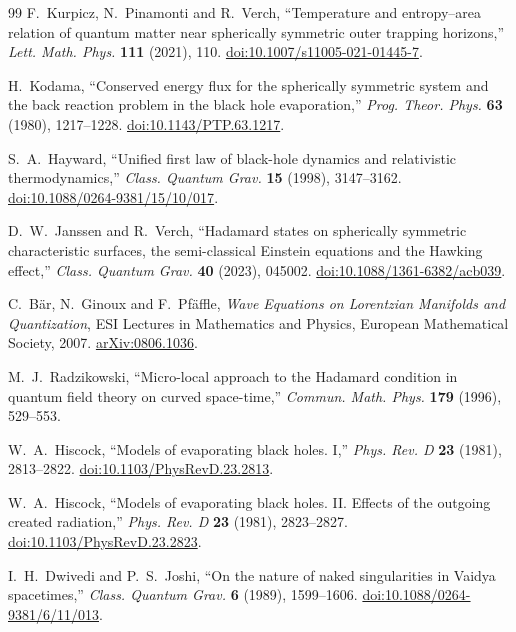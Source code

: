 \documentclass[11pt,a4paper]{article}
\theoremstyle{definition}
\theoremstyle{remark}
\begin{document}
\begin{thebibliography}{99}
		F.~Kurpicz, N.~Pinamonti and R.~Verch,
		``Temperature and entropy--area relation of quantum matter near spherically
		symmetric outer trapping horizons,''
		\emph{Lett. Math. Phys.} \textbf{111} (2021), 110.
		\href{https://doi.org/10.1007/s11005-021-01445-7}{doi:10.1007/s11005-021-01445-7}.
		
		H.~Kodama,
		``Conserved energy flux for the spherically symmetric system and the back
		reaction problem in the black hole evaporation,''
		\emph{Prog. Theor. Phys.} \textbf{63} (1980), 1217--1228.
		\href{https://doi.org/10.1143/PTP.63.1217}{doi:10.1143/PTP.63.1217}.
		
		S.~A.~Hayward,
		``Unified first law of black-hole dynamics and relativistic thermodynamics,''
		\emph{Class. Quantum Grav.} \textbf{15} (1998), 3147--3162.
		\href{https://doi.org/10.1088/0264-9381/15/10/017}{doi:10.1088/0264-9381/15/10/017}.
		
		D.~W.~Janssen and R.~Verch,
		``Hadamard states on spherically symmetric characteristic surfaces, the
		semi-classical Einstein equations and the Hawking effect,''
		\emph{Class. Quantum Grav.} \textbf{40} (2023), 045002.
		\href{https://doi.org/10.1088/1361-6382/acb039}%
		{doi:10.1088/1361-6382/acb039}.
		
		C.~B\"ar, N.~Ginoux and F.~Pf\"affle,
		\emph{Wave Equations on Lorentzian Manifolds and Quantization},
		ESI Lectures in Mathematics and Physics, European Mathematical Society, 2007.
		\href{https://arxiv.org/abs/0806.1036}{arXiv:0806.1036}.
		
		M.~J.~Radzikowski,
		``Micro-local approach to the Hadamard condition in quantum field theory on
		curved space-time,''
		\emph{Commun. Math. Phys.} \textbf{179} (1996), 529--553.
		
		W.~A.~Hiscock,
		``Models of evaporating black holes. I,''
		\emph{Phys. Rev. D} \textbf{23} (1981), 2813--2822.
		\href{https://doi.org/10.1103/PhysRevD.23.2813}{doi:10.1103/PhysRevD.23.2813}.
		
		W.~A.~Hiscock,
		``Models of evaporating black holes. II. Effects of the outgoing created
		radiation,''
		\emph{Phys. Rev. D} \textbf{23} (1981), 2823--2827.
		\href{https://doi.org/10.1103/PhysRevD.23.2823}{doi:10.1103/PhysRevD.23.2823}.
		
		I.~H.~Dwivedi and P.~S.~Joshi,
		``On the nature of naked singularities in Vaidya spacetimes,''
		\emph{Class. Quantum Grav.} \textbf{6} (1989), 1599--1606.
		\href{https://doi.org/10.1088/0264-9381/6/11/013}%
		{doi:10.1088/0264-9381/6/11/013}.
		

\end{thebibliography}
\end{document}
